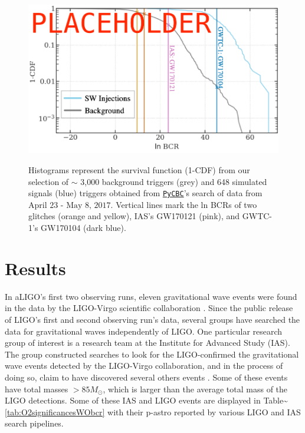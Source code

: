 \documentclass[%
preprint,
 amsmath,amssymb,
 aps,
]{revtex4}
\newcommand{\pycbc}{{\sc \href{https://pycbc.org/}{\texttt{PyCBC}}}\xspace}
\begin{document}
\begin{figure}[!h]
{\centering \includegraphics[width=0.75\linewidth]{images/bcr_cdf} }
\caption[BCR distribution example]{Histograms represent the survival function (1-CDF) from our selection of $\sim$ 3,000 background triggers (grey) and 648 simulated signals (blue) triggers obtained from \pycbc's search of data from $\text{April 23 - May 8, 2017}$. Vertical lines mark the ln BCRs of two glitches (orange and yellow), IAS's GW170121 (pink), and GWTC-1's GW170104 (dark blue).}\label{fig:bcrCdf}
\end{figure}






\section{\label{sec:Results}Results}

In aLIGO's first two observing runs, eleven gravitational wave events were found in the data by the LIGO-Virgo scientific collaboration \citep{abbott2019gwtc}. Since the public release of LIGO's first and second observing run's data, several groups have searched the data for gravitational waves independently of LIGO. One particular research group of interest is a research team at the Institute for Advanced Study (IAS). The group constructed searches to look for the LIGO-confirmed the gravitational wave events detected by the LIGO-Virgo collaboration, and in the process of doing so, claim to have discovered several others events \citep{IAS0, IAS1, IAS2}. Some of these events have total masses \(>85 M_{\odot}\), which is larger than the average total mass of the LIGO detections. Some of these IAS and LIGO events are displayed in Table\textasciitilde\ref{tab:O2significancesWObcr} with their p-astro reported by various LIGO and IAS search pipelines.\\
\end{document}
